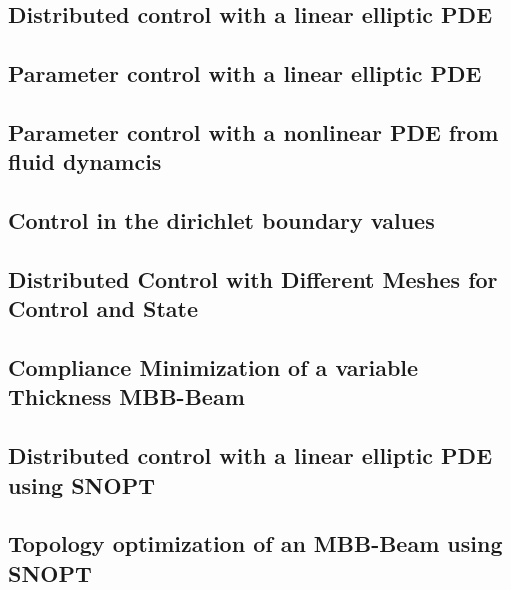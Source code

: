 \documentclass[a4paper,cleardoubleempty]{scrreprt}
\begin{document}
\subsection{Distributed control with a linear elliptic PDE}
\label{OPT_Stat_Distrib_Lin_Ellipt}

\clearpage
\subsection{Parameter control with a linear elliptic PDE}
\label{OPT_Stat_Param_Lin_Ellipt}

\clearpage
\subsection{Parameter control with a nonlinear PDE from fluid dynamcis}
\label{OPT_Stat_Param_Nonlin_Fluid}

\clearpage
\subsection{Control in the dirichlet boundary values}
\label{OPT_Stat_Dirichlet_Boundary}

\clearpage
\subsection{Distributed Control with Different Meshes for Control and State}
\label{OPT_Stat_Distributed_MultiMesh}

\clearpage
\subsection{Compliance Minimization of a variable Thickness MBB-Beam}
\label{OPT_Stat_MBB-Beam}

\clearpage
\subsection{Distributed control with a linear elliptic PDE using SNOPT}
\label{OPT_Stat_Box_controlconstraints_SNOPT}

\clearpage
\subsection{Topology optimization of an MBB-Beam using SNOPT}
\label{OPT_Stat_TopOpt_MBB_SNOPT}

\clearpage
\end{document}
